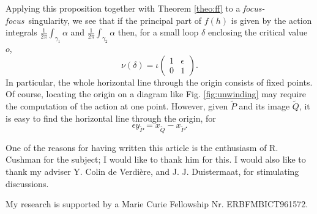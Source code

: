 \documentclass[cmp]{svjour}  %
\newcommand{\ff}{\emph{focus-focus}}
\begin{document}
Applying this proposition together with Theorem \ref{theo:ff} to a \ff\
singularity, we see that if the principal part of $f(h)$ is given by
the action integrals $\frac{1}{2\pi}\int_{\gamma_1}\alpha$ and
$\frac{1}{2\pi}\int_{\gamma_2}\alpha$ then, for a small loop
$\delta$ enclosing the critical value $o$,
\[ \nu(\delta) = \iota\left(
  \begin{array}{cc}
1 & \epsilon \\ 0 &  1
  \end{array}\right). \]
In particular, the whole horizontal line through the origin consists
of fixed points. Of course, locating the origin on a diagram like
Fig. \ref{fig:unwinding} may require the computation of the action
at one point. However, given $\tilde{P}$ and its image $\tilde{Q}$, it
is easy to find the horizontal line through the origin, for
\[ \epsilon y_{\tilde{P}} = x_{\tilde{Q}} - x_{\tilde{P}}.\]
\begin{acknowledgements} One of the reasons for having written
this article is the enthusiasm of R. Cushman for the subject; I would
like to thank him for this. I would also like to thank my adviser
Y. Colin de Verdi\`ere, and J. J. Duistermaat, for stimulating
discussions.

My research is supported by a Marie Curie Fellowship
Nr. ERBFMBICT961572.
\end{acknowledgements}
\end{document}
